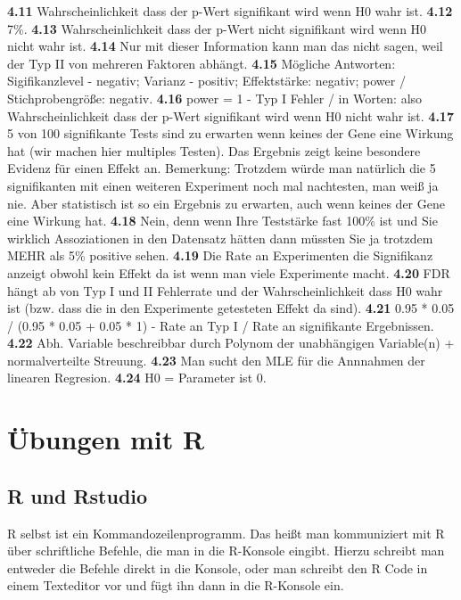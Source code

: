 \documentclass[a4paper,twoside]{tufte-book}\usepackage[]{graphicx}\usepackage[]{color}
\begin{document}
\begin{appendices}
\begin{fullwidth}
\textbf{4.11} Wahrscheinlichkeit dass der p-Wert signifikant wird wenn H0 wahr ist.
\textbf{4.12} 7\%.
\textbf{4.13} Wahrscheinlichkeit dass der p-Wert nicht signifikant wird wenn H0 nicht wahr ist.
\textbf{4.14} Nur mit dieser Information kann man das nicht sagen, weil der Typ II von mehreren Faktoren abhängt.
\textbf{4.15} Mögliche Antworten: Sigifikanzlevel - negativ; Varianz - positiv; Effektstärke: negativ; power / Stichprobengröße: negativ.
\textbf{4.16} power = 1 - Typ I Fehler / in Worten: also Wahrscheinlichkeit dass der p-Wert signifikant wird wenn H0 nicht wahr ist.
\textbf{4.17} 5 von 100 signifikante Tests sind zu erwarten wenn keines der Gene eine Wirkung hat (wir machen hier multiples Testen). Das Ergebnis zeigt keine besondere Evidenz für einen Effekt an. Bemerkung: Trotzdem würde man natürlich die 5 signifikanten mit einen weiteren Experiment noch mal nachtesten, man weiß ja nie. Aber statistisch ist so ein Ergebnis zu erwarten, auch wenn keines der Gene eine Wirkung hat.
\textbf{4.18} Nein, denn wenn Ihre Teststärke fast 100\% ist und Sie wirklich Assoziationen in den Datensatz hätten dann müssten Sie ja trotzdem MEHR als 5\% positive sehen.
\textbf{4.19} Die Rate an Experimenten die Signifikanz anzeigt obwohl kein Effekt da ist wenn man viele Experimente macht.
\textbf{4.20} FDR hängt ab von Typ I und II Fehlerrate und der Wahrscheinlichkeit dass H0 wahr ist (bzw. dass die in den Experimente getesteten Effekt da sind).
\textbf{4.21} 0.95 * 0.05 / (0.95 * 0.05 + 0.05 * 1) - Rate an Typ I / Rate an signifikante Ergebnissen.
\textbf{4.22} Abh. Variable beschreibbar durch Polynom der unabhängigen Variable(n) + normalverteilte Streuung.
\textbf{4.23} Man sucht den MLE für die Annnahmen der linearen Regresion.
\textbf{4.24} H0 = Parameter ist 0.

\end{fullwidth}

\chapter{Übungen mit R}

\section{R und Rstudio}

R selbst ist ein Kommandozeilenprogramm. Das heißt man kommuniziert mit R über schriftliche Befehle, die man in die R-Konsole eingibt. Hierzu schreibt man entweder die Befehle direkt in die Konsole, oder man schreibt den R Code in einem Texteditor vor und fügt ihn dann in die R-Konsole ein.


\end{appendices}
\end{document}
